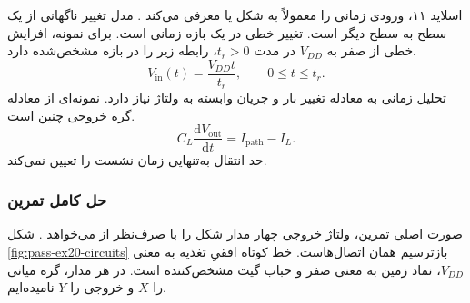 اسلاید ۱۱، ورودی زمانی را معمولاً به شکل  یا
 معرفی می‌کند \cite{dcslides}.
 مدل تغییر ناگهانی از یک سطح به سطح دیگر است.
 تغییر خطی در یک بازه زمانی است. برای نمونه،
افزایش خطی از صفر به \(V_{DD}\) در مدت \(t_r>0\)،
رابطه زیر را در بازه مشخص‌شده دارد.
\[
 V_{\mathrm{in}}(t)=\frac{V_{DD}t}{t_r},\qquad 0\le t\le t_r.
\]
تحلیل زمانی به معادله تغییر بار و جریان وابسته به ولتاژ نیاز دارد.
نمونه‌ای از معادله گره خروجی چنین است.
\[
 C_L\frac{\mathrm{d}V_{\mathrm{out}}}{\mathrm{d}t}=I_{\mathrm{path}}-I_L.
\]
حد انتقال به‌تنهایی زمان
نشست را تعیین نمی‌کند.

\subsubsection{حل کامل تمرین }
\label{sec:pass-ex20}
صورت اصلی تمرین، ولتاژ خروجی چهار مدار شکل
 را با صرف‌نظر از  می‌خواهد
\cite[صفحه چاپی ۹۷]{weste}. شکل
\ref{fig:pass-ex20-circuits} بازترسیم همان اتصال‌هاست.
خط کوتاه افقیِ تغذیه به معنی \(V_{DD}\)، نماد زمین به معنی
صفر و حباب گیت مشخص‌کننده  است.
در هر مدار، گره میانی را \(X\) و خروجی را \(Y\) نامیده‌ایم.
